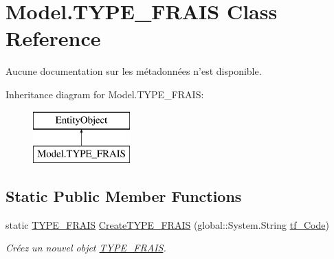 \hypertarget{class_model_1_1_t_y_p_e___f_r_a_i_s}{\section{Model.\-T\-Y\-P\-E\-\_\-\-F\-R\-A\-I\-S Class Reference}
\label{class_model_1_1_t_y_p_e___f_r_a_i_s}
}


Aucune documentation sur les métadonnées n'est disponible.  


Inheritance diagram for Model.\-T\-Y\-P\-E\-\_\-\-F\-R\-A\-I\-S\-:\begin{figure}[H]
\begin{center}
\leavevmode
\includegraphics[height=2.000000cm]{class_model_1_1_t_y_p_e___f_r_a_i_s}
\end{center}
\end{figure}
\subsection*{Static Public Member Functions}
\begin{DoxyCompactItemize}
\item 
static \hyperlink{class_model_1_1_t_y_p_e___f_r_a_i_s}{T\-Y\-P\-E\-\_\-\-F\-R\-A\-I\-S} \hyperlink{class_model_1_1_t_y_p_e___f_r_a_i_s_ac9e015938b9538082d6f9c0eaed9bc2e}{Create\-T\-Y\-P\-E\-\_\-\-F\-R\-A\-I\-S} (global\-::\-System.\-String \hyperlink{class_model_1_1_t_y_p_e___f_r_a_i_s_ac8c5a8aeabcb4b38a50db20d886ecb9e}{tf\-\_\-\-Code})
\begin{DoxyCompactList}\small\item\em Créez un nouvel objet \hyperlink{class_model_1_1_t_y_p_e___f_r_a_i_s}{T\-Y\-P\-E\-\_\-\-F\-R\-A\-I\-S}. \end{DoxyCompactList}\end{DoxyCompactItemize}
